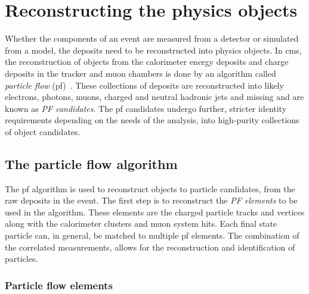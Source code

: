 \chapter{Reconstructing the physics objects}
\label{ch:ObjectReconstruction}

Whether the components of an event are measured from a detector or simulated from a model, the deposits need to be reconstructed into physics objects. 
In \acrshort{cms}, the reconstruction of objects from the calorimeter energy deposits and charge deposits in the tracker and muon chambers is done by an algorithm called \textit{particle flow} (\acrshort{pf})~\cite{Event:PFlow}.
These collections of deposits are reconstructed into likely electrons, photons, muons, charged and neutral hadronic jets and missing \pt{} and are known as \textit{PF candidates}.
The \acrshort{pf} candidates undergo further, stricter identity requirements depending on the needs of the analysis, into high-purity collections of object candidates.


\section{The particle flow algorithm}
\label{sec:PFlow}

The \acrshort{pf} algorithm is used to reconstruct objects to particle candidates, from the raw deposits in the event. 
The first step is to reconstruct the \textit{PF elements} to be used in the algorithm.
These elements are the charged particle tracks and vertices along with the calorimeter clusters and muon system hits.
Each final state particle can, in general, be matched to multiple \acrshort{pf} elements.
The combination of the correlated measurements, allows for the reconstruction and identification of particles.

\subsection{Particle flow elements} %
\label{sub:Particle_flow_elements}

